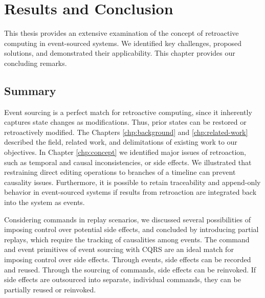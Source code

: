\chapter{Results and Conclusion}
\label{chp:results}

This thesis provides an extensive examination of the concept of retroactive 
computing in event-sourced systems. We identified key challenges, proposed 
solutions, and demonstrated their applicability. This chapter provides our 
concluding remarks.

\section{Summary}
Event sourcing is a perfect match for retroactive computing, since it inherently 
captures state changes as modifications. Thus, prior states can be restored or 
retroactively modified.
%
The Chapters \ref{chp:background} and \ref{chp:related-work} described the field, 
related work, and delimitations of existing work to our objectives. In Chapter 
\ref{chp:concept} we identified major issues of retroaction, such as temporal 
and causal inconsistencies, or side effects. We illustrated that restraining 
direct editing operations to branches of a timeline can prevent causality issues. 
Furthermore, it is possible to retain traceability and append-only behavior in
event-sourced systems if results from retroaction are integrated back into the 
system as events.

Considering commands in replay scenarios, we discussed several possibilities of 
imposing control over potential side effects, and concluded by introducing partial 
replays, which require the tracking of causalities among events. 
The command and event primitives of event sourcing with CQRS are an ideal match 
for imposing control over side effects. Through events, side effects can be 
recorded and reused. Through the sourcing of commands, side effects can be 
reinvoked. If side effects are outsourced into separate, individual commands, 
they can be partially reused or reinvoked.


